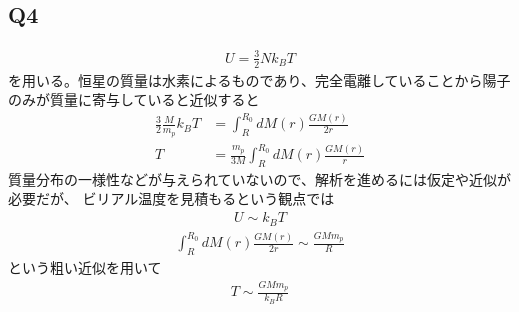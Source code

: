 \subsection{Q4}
\begin{align*}
    U=\frac{3}{2}Nk_BT
\end{align*}
を用いる。恒星の質量は水素によるものであり、完全電離していることから陽子のみが質量に寄与していると近似すると
\begin{align}
    \frac{3}{2}\frac{M}{m_p}k_BT&=\int^{R_0}_RdM(r)\frac{GM(r)}{2r}\nonumber\\
    T&=\frac{m_p}{3M}\int^{R_0}_RdM(r)\frac{GM(r)}{r}
\end{align}
質量分布の一様性などが与えられていないので、解析を進めるには仮定や近似が必要だが、
ビリアル温度を見積もるという観点では
\begin{align*}
    U\sim k_BT
\end{align*}
\begin{align*}
    \int^{R_0}_RdM(r)\frac{GM(r)}{2r}\sim\frac{GMm_p}{R}
\end{align*}
という粗い近似を用いて
\begin{align}
    T\sim\frac{GMm_p}{k_BR}
\end{align}
